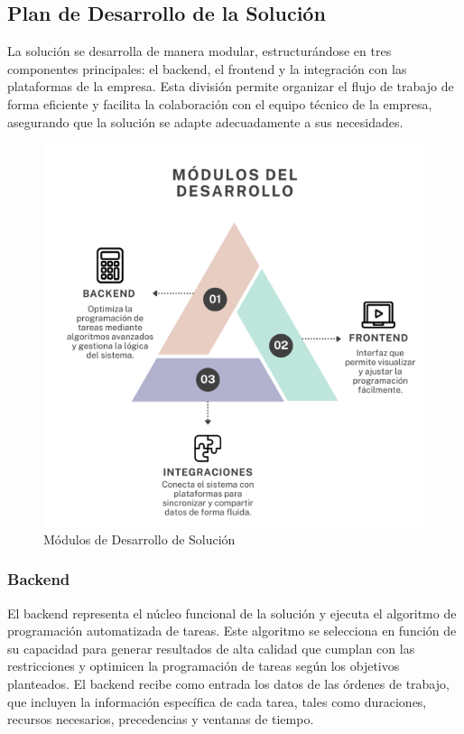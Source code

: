 \documentclass{article}
\begin{document}
\subsection{Plan de Desarrollo de la Solución}

La solución se desarrolla de manera modular, estructurándose en tres componentes principales: el backend, el frontend y la integración con las plataformas de la empresa. Esta división permite organizar el flujo de trabajo de forma eficiente y facilita la colaboración con el equipo técnico de la empresa, asegurando que la solución se adapte adecuadamente a sus necesidades.

\begin{figure}[htbp]
  \centering
  \includegraphics[scale=0.3]{imgs/ModulosDesarrollo.png}
  \caption{Módulos de Desarrollo de Solución}
  \label{fig:modulos-desarrollo}
\end{figure}


\subsubsection{Backend}

El backend representa el núcleo funcional de la solución y ejecuta el algoritmo de programación automatizada de tareas. Este algoritmo se selecciona en función de su capacidad para generar resultados de alta calidad que cumplan con las restricciones y optimicen la programación de tareas según los objetivos planteados. El backend recibe como entrada los datos de las órdenes de trabajo, que incluyen la información específica de cada tarea, tales como duraciones, recursos necesarios, precedencias y ventanas de tiempo.
\end{document}
